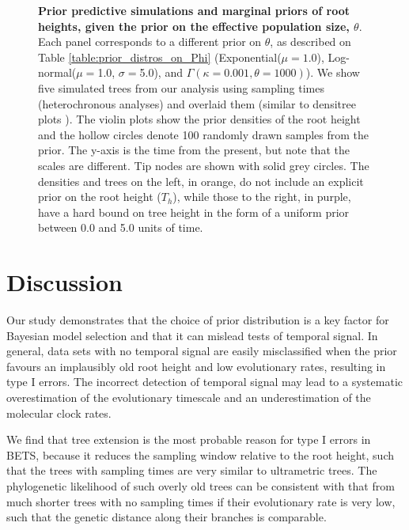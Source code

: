 \documentclass[10pt,letterpaper]{article}
\begin{document}
\begin{figure}[!h]
\begin{center}
		\caption{\textbf{Prior predictive simulations and marginal priors of root heights, given the prior on the effective population size, $\theta$}. Each panel corresponds to a different prior on $\theta$, as described on Table \ref{table:prior_distros_on_Phi} (Exponential($\mu=1.0$), Log-normal($\mu=$1.0, $\sigma=$5.0), and $\Gamma(\kappa=0.001, \theta=1000)$). We show five simulated trees from our analysis using sampling times (heterochronous analyses) and overlaid them (similar to densitree plots \cite{bouckaert2010densitree}). The violin plots show the prior densities of the root height and the hollow circles denote 100 randomly drawn samples from the prior. The y-axis is the time from the present, but note that the scales are different. Tip nodes are shown with solid grey circles. The densities and trees on the left, in orange, do not include an explicit prior on the root height ($T_h$), while those to the right, in purple, have a hard bound on tree height in the form of a uniform prior between 0.0 and 5.0 units of time.}
		\label{figure:prior_tree_distros}
	\end{center}
\end{figure}

\section*{Discussion}
Our study demonstrates that the choice of prior distribution is a key factor for Bayesian model selection and that it can mislead tests of temporal signal. In general, data sets with no temporal signal are easily misclassified when the prior favours an implausibly old root height and low evolutionary rates, resulting in type I errors. The incorrect detection of temporal signal may lead to a systematic overestimation of the evolutionary timescale and an underestimation of the molecular clock rates.

We find that tree extension is the most probable reason for type I errors in BETS, because it reduces the sampling window relative to the root height, such that the trees with sampling times are very similar to ultrametric trees. The phylogenetic likelihood of such overly old trees can be consistent with that from much shorter trees with no sampling times if their evolutionary rate is very low, such that the genetic distance along their branches is comparable. 
\end{document}
